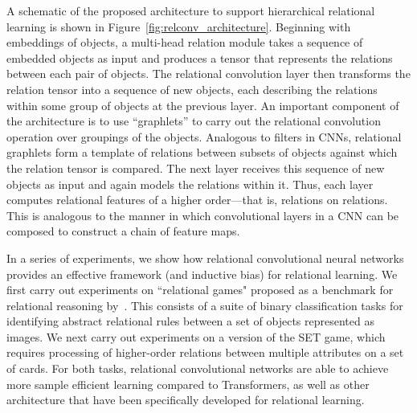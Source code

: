 A schematic of the proposed architecture to support hierarchical relational learning is shown in Figure~\ref{fig:relconv_architecture}. Beginning with embeddings of objects, a multi-head relation module takes a sequence of embedded objects as input and produces a tensor that represents the relations between each pair of objects. The relational convolution layer then transforms the relation tensor into a sequence of new objects, each describing the relations within some group of objects at the previous layer.  An important component of the architecture is to use ``graphlets'' to carry out the relational convolution operation over groupings of the objects. Analogous to filters in CNNs, relational graphlets form a template of relations between subsets of objects against which the relation tensor is compared. The next layer receives this sequence of new objects as input and again models the relations within it. Thus, each layer computes relational features of a higher order---that is, relations on relations. This is analogous to the manner in which convolutional layers in a CNN can be composed to construct a chain of feature maps.

In a series of experiments, we show how relational convolutional neural networks provides an effective framework (and inductive bias) for relational learning. We first carry out experiments on ``relational games" proposed as a benchmark for relational reasoning by~\citep{shanahanExplicitlyRelationalNeural}. This consists of a suite of binary classification tasks for identifying abstract relational rules between a set of objects represented as images. We next carry out experiments on a version of the SET game, which requires processing of  higher-order relations between multiple attributes on a set of cards. For both tasks, relational convolutional networks are able to achieve more sample efficient learning compared to Transformers, as well as other architecture that have been specifically developed for relational learning.

